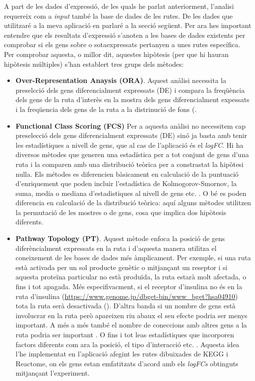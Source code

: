 A part de les dades d'expressió, de les quals he parlat anteriorment, l'analisi requereix com a \textit{input} també la base de dades de les rutes. De les dades que utilitzaré a la meva aplicació en parlaré a la secció següent. Per ara hes important entendre que els resultats d'expressió s'anoten a les bases de dades existents per comprobar si els gens sobre o sotaexpressats pertanyen a unes rutes específica. Per comprobar aquesta, o millor dit, aquestes hipòtesis (per que hi hauran hipòtesis múltiples) s'han establert tres grups dels mètodes:

\begin{itemize}
\item \textbf{Over-Representation Anaysis (ORA)}.
Aquest anàlisi necessita la preselcció dels gens diferencialment expressats (DE) i compara la freqüència dels gens de la ruta d'interès en la mostra dels gens diferencialment expessats i la freqüencia dels gens de la ruta a la distrinució de fons (\cite{boyle2004go}. 
\item \textbf{Functional Class Scoring (FCS)}
Per a aquesta anàlisi no necessitem cap preselecció dels gens diferencialment expressats (DE) sinó ja basta amb tenir les estadístiques a nivell de gens, que al cas de l'aplicació és el \textit{logFC}. Hi ha diversos mètodes que generen una estadística per a tot conjunt de gens d'una ruta i la comparen amb una distribució teòrica per a constrastat la hipòtesi nulla. Els métodes es diferencien bàsicament en calculació de la puntuació d'enriquement que poden incluir l'estadística de Kolmogorov-Smornov, la suma, media o mediana d'estadistiques al nivell de gens etc. \cite{khatri2012ten}. O bé es poden diferencia en calculació de la distribució teòrica: aquí alguns mètodes utilitzen la permutació de les mostres  o de gens, cosa que implica dos hipòtesis diferents.  
\item \textbf{Pathway Topology (PT)}.
Aquest mètode enfoca la posició de gens diferèncialment expressats en la ruta i d'aquesta manera utilitza el coneixement de les bases de dades més àmplicament. Per exemple, si una ruta està activada per un sol producte genètic o mitjançant un reseptor i si aquesta proteïna particular no està produïda, la ruta estarà molt afectada, o fins i tot apagada. Més especifivacment, si el receptor d'insulina no és en la ruta d'insulina (\url{https://www.genome.jp/dbget-bin/www_bget?hsa04910}) tota la ruta serà desactivada (\cite{tarca2008novel}). D'altra banda si un nombre de gens està involucrar en la ruta però apareixen riu abaux el seu efecte podria ser menys important. A més a més també el nombre de coneccions amb altres gens a la ruta podria ser important \cite{rahnenfuhrer2004calculating}. O fins i tot leas estadístiques que incorporen factors diferents com ara la posició, el tipo d'interacció etc. \cite{draghici2007systems}. Aquesta idea l'he implementat en l'aplicació afegint les rutes dibuixades de KEGG i Reactome, on els gens estan emfatitzats d'acord amb els \textit{logFCs} obtinguts mitjançant l'experiment.


\end{itemize}
